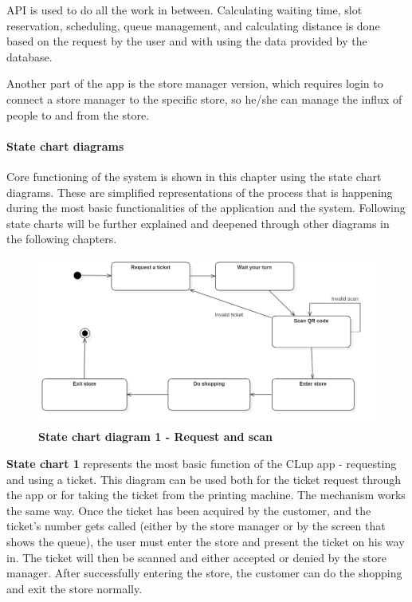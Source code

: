 API is used to do all the work in between. Calculating waiting time, slot reservation, scheduling, queue management, and calculating distance is done based on the request by the user and with using the data provided by the database. 

Another part of the app is the store manager version, which requires login to connect a store manager to the specific store, so he/she can manage the influx of people to and from the store.

\paragraph{State chart diagrams}\hfill \break

\hspace{\parindent}Core functioning of the system is shown in this chapter using the state chart diagrams. These are simplified representations of the process that is happening during the most basic functionalities of the application and the system. Following state charts will be further explained and deepened through other diagrams in the following chapters. 

\begin{figure}[!htb]
\centering
\includegraphics[width=\textwidth]{Images/StatechartDiagram1_RequestAndScan.png}
\caption{\label{fig:statechart1}\textbf{State chart diagram 1 - Request and scan}}
\end{figure}

\hspace{\parindent}\textbf{State chart 1} represents the most basic function of the CLup app - requesting and using a ticket. This diagram can be used both for the ticket request through the app or for taking the ticket from the printing machine. The mechanism works the same way. Once the ticket has been acquired by the customer, and the ticket's number gets called (either by the store manager or by the screen that shows the queue), the user must enter the store and present the ticket on his way in. The ticket will then be scanned and either accepted or denied by the store manager. After successfully entering the store, the customer can do the shopping and exit the store normally.  

